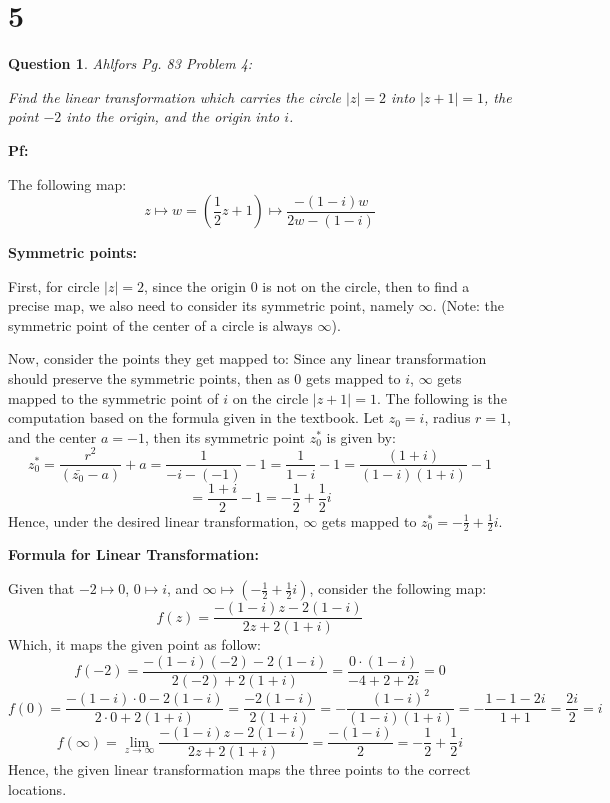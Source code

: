 \documentclass{article}
\newtheorem{question}{Question}
\begin{document}
\break

\section*{5}
\begin{myBox}[]{}
    \begin{question}
        Ahlfors Pg. 83 Problem 4:

        Find the linear transformation which carries the circle $|z|=2$ into $|z+1|=1$,
        the point $-2$ into the origin, and the origin into $i$.
    \end{question}
\end{myBox}

\textbf{Pf:}

The following map:
$$z\mapsto w=(\frac{1}{2}z+1)\mapsto \frac{-(1-i)w}{2w-(1-i)}$$

\textbf{Symmetric points:}

First, for circle $|z|=2$, since the origin $0$ is not on the circle, then to find a precise map, we also need to consider
its symmetric point, namely $\infty$. (Note: the symmetric point of the center of a circle is always $\infty$).

\hfill

Now, consider the points they get mapped to: Since any linear transformation should preserve the symmetric points,
then as $0$ gets mapped to $i$, $\infty$ gets mapped to the symmetric point of $i$ on the circle $|z+1|=1$.
The following is the computation based on the formula given in the textbook. Let $z_0=i$, radius $r=1$, and the center $a=-1$, then its symmetric point $z_0^*$ is given by:
$$z_0^*=\frac{r^2}{(\bar{z_0}-a)}+a = \frac{1}{-i-(-1)}-1 = \frac{1}{1-i}-1 = \frac{(1+i)}{(1-i)(1+i)}-1$$
$$=\frac{1+i}{2}-1 = -\frac{1}{2}+\frac{1}{2}i$$
Hence, under the desired linear transformation, $\infty$ gets mapped to $z_0^*=-\frac{1}{2}+\frac{1}{2}i$.

\hfill

\textbf{Formula for Linear Transformation:}

Given that $-2\mapsto 0$, $0\mapsto i$, and $\infty\mapsto (-\frac{1}{2}+\frac{1}{2}i)$, consider the following map:
$$f(z) = \frac{-(1-i)z-2(1-i)}{2z+2(1+i)}$$
Which, it maps the given point as follow:
$$f(-2)=\frac{-(1-i)(-2)-2(1-i)}{2(-2)+2(1+i)}=\frac{0\cdot(1-i)}{-4+2+2i}=0$$
$$f(0)=\frac{-(1-i)\cdot 0-2(1-i)}{2\cdot 0+2(1+i)}=\frac{-2(1-i)}{2(1+i)}=-\frac{(1-i)^2}{(1-i)(1+i)} = -\frac{1-1-2i}{1+1}=\frac{2i}{2}=i$$
$$f(\infty)=\lim_{z\rightarrow\infty}\frac{-(1-i)z-2(1-i)}{2z+2(1+i)} = \frac{-(1-i)}{2} = -\frac{1}{2}+\frac{1}{2}i$$
Hence, the given linear transformation maps the three points to the correct locations.
\end{document}
